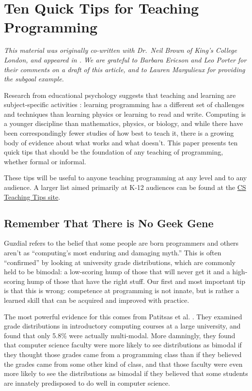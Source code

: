 \chapter{Ten Quick Tips for Teaching Programming}\label{s:ten}

\emph{
  This material was originally co-written with Dr.\ Neil Brown of
  King's College London, and appeared in \cite{Brow2018}.  We are
  grateful to Barbara Ericson and Leo Porter for their comments on a
  draft of this article, and to Lauren Margulieux for providing the
  subgoal example.
}

Research from educational psychology suggests that teaching and
learning are subject-specific activities \cite{Maye2004}: learning
programming has a different set of challenges and techniques than
learning physics or learning to read and write.  Computing is a
younger discipline than mathematics, physics, or biology, and while
there have been correspondingly fewer studies of how best to teach it,
there is a growing body of evidence about what works and what doesn't.
This paper presents ten quick tips that should be the foundation of
any teaching of programming, whether formal or informal.

These tips will be useful to anyone teaching programming at any level
and to any audience. A larger list aimed primarily at K-12 audiences
can be found at the \href{http://csteachingtips.org/}{CS Teaching Tips
  site}.

\section*{Remember That There is No Geek Gene}

Guzdial \cite{Guzd2015b} refers to the belief that some people are
born programmers and others aren't as ``computing's most enduring and
damaging myth.''  This is often ``confirmed'' by looking at university
grade distributions, which are commonly held to be bimodal: a
low-scoring hump of those that will never get it and a high-scoring
hump of those that have the right stuff.  Our first and most important
tip is that this is wrong: competence at programming is not innate,
but is rather a learned skill that can be acquired and improved with
practice.

The most powerful evidence for this comes from Patitsas et
al. \cite{Pati2016}.  They examined grade distributions in
introductory computing courses at a large university, and found that
only 5.8\% were actually multi-modal.  More damningly, they found that
computer science faculty were more likely to see distributions as
bimodal if they thought those grades came from a programming class
than if they believed the grades came from some other kind of class,
and that those faculty were even more likely to see the distributions
as bimodal if they believed that some students are innately
predisposed to do well in computer science.

